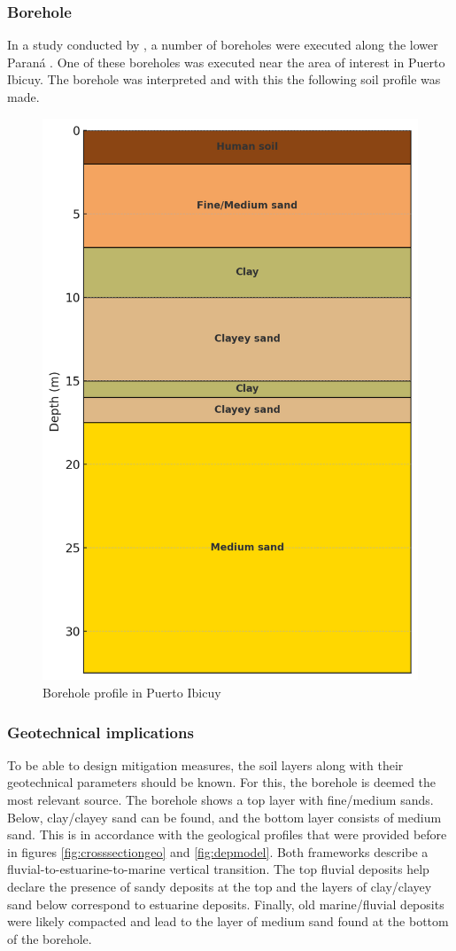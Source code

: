 \subsubsection{Borehole}
In a study conducted by \citeauthor{amatoESTRATIGRAFIACUATERNARIASUBSUELO2009}, a number of boreholes were executed along the lower Paraná \autocite{amatoESTRATIGRAFIACUATERNARIASUBSUELO2009}. One of these boreholes was executed near the area of interest in Puerto Ibicuy. The borehole was interpreted and with this the following soil profile was made.

\begin{figure}[H]
    \centering
    \includegraphics[width=0.45\linewidth]{figures//ch9/Bodemprofiel.png}
    \caption{Borehole profile in Puerto Ibicuy \autocite{amatoESTRATIGRAFIACUATERNARIASUBSUELO2009}}
    \label{fig:borehole}
\end{figure}

\subsubsection{Geotechnical implications}
To be able to design mitigation measures, the soil layers along with their geotechnical parameters should be known. For this, the borehole is deemed the most relevant source. The borehole shows a top layer with fine/medium sands. Below, clay/clayey sand can be found, and the bottom layer consists of medium sand. This is in accordance with the geological profiles that were provided before in figures \ref{fig:crosssectiongeo} and \ref{fig:depmodel}. Both frameworks describe a fluvial-to-estuarine-to-marine vertical transition. The top fluvial deposits help declare the presence of sandy deposits at the top and the layers of clay/clayey sand below correspond to estuarine deposits. Finally, old marine/fluvial deposits were likely compacted and lead to the layer of medium sand found at the bottom of the borehole.

